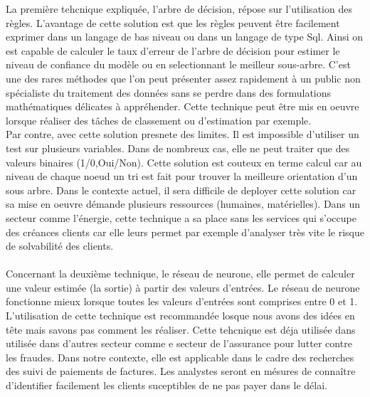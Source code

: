 \documentclass[11pt,a4paper]{report}
\begin{document}
La première tehcnique expliquée, l'arbre de décision, répose sur l'utilisation des règles. L'avantage de cette solution est que les règles peuvent être facilement exprimer dans un langage de bas niveau ou dans un langage de type Sql. Ainsi on est capable de calculer le taux d'erreur de l'arbre de décision pour estimer le niveau de confiance du modèle ou en selectionnant le meilleur sous-arbre. C’est une des rares méthodes que l’on peut présenter assez rapidement à un public non spécialiste du traitement des données sans se perdre dans des formulations mathématiques délicates à appréhender. Cette technique peut être mis en oeuvre lorsque réaliser des tâches de classement ou d'estimation par exemple. \\
Par contre, avec cette solution presnete des limites. Il est impossible d'utiliser un test sur plusieurs variables. Dans de nombreux cas, elle ne peut traiter que des valeurs binaires (1/0,Oui/Non). Cette solution est couteux en terme calcul car au niveau de chaque noeud un tri est fait pour trouver la meilleure orientation d'un sous arbre. Dans le contexte actuel, il sera difficile de deployer cette solution car sa mise en oeuvre démande plusieurs ressources (humaines, matérielles). Dans un secteur comme l'énergie, cette technique a sa place sans les services qui s'occupe des créances clients car elle leurs permet par exemple d'analyser très vite le risque de solvabilité des clients.\\\\

Concernant la deuxième technique, le réseau de neurone, elle permet de calculer une valeur estimée (la sortie) à partir des valeurs d'entrées. Le réseau de neurone fonctionne mieux lorsque toutes les valeurs d'entrées sont comprises entre 0 et 1. L'utilisation de cette technique est recommandée losque nous avons des idées en tête mais savons pas comment les réaliser. Cette tehcnique est déja utilisée dans utilisée dans d'autres secteur comme e secteur de l'assurance pour lutter contre les fraudes. Dans notre contexte, elle est applicable dans le cadre des recherches des suivi de paiements de factures. Les analystes seront en mésures de connaître d'identifier facilement les clients suceptibles de ne pas payer dans le délai. \\
\end{document}
